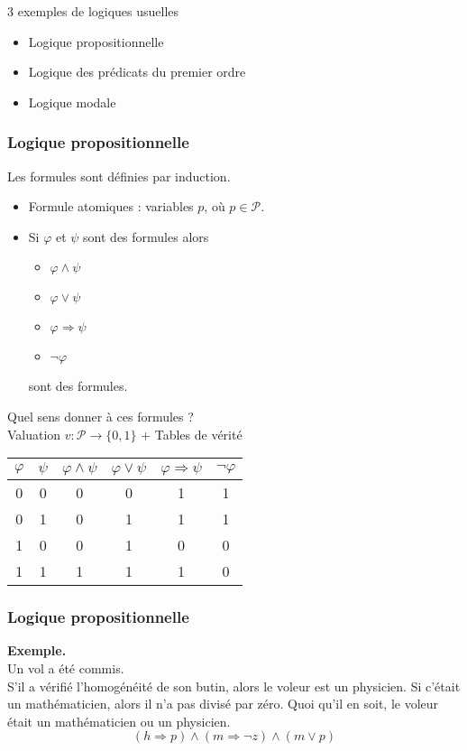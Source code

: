 \documentclass{beamer}
\newcommand{\itemz}{\item[$\triangleright$]}
\begin{document}
\begin{frame}
3 exemples de logiques usuelles
\begin{itemize}
\itemz Logique propositionnelle
\itemz Logique des prédicats du premier ordre
\itemz Logique modale
\end{itemize}
\end{frame}

\begin{frame}
\frametitle{Logique propositionnelle}
Les formules sont définies par induction.
\pause
\begin{itemize}
\itemz Formule atomiques : variables $p$, où $p \in \mathcal{P}$.
\pause
\itemz Si $\varphi$ et $\psi$ sont des formules alors
\pause
\begin{itemize}
\itemz $\varphi \wedge \psi$
\pause
\itemz $\varphi \vee \psi$
\pause
\itemz $\varphi \Rightarrow \psi$
\pause
\itemz $\neg \varphi$
\end{itemize}
sont des formules.
\end{itemize}
\pause
Quel sens donner à ces formules ? \\
Valuation $v : \mathcal{P} \to \{0,1\}$ + Tables de vérité
\pause
\begin{center}
\begin{tabular}{|c|c|c|c|c|c|}
  \hline
  $\varphi$ & $\psi$ & $\varphi \wedge \psi$ & $\varphi \vee \psi$ & $\varphi \Rightarrow \psi$ & $\neg \varphi$ \\
  \hline
  0 & 0 & 0 & 0 & 1 & 1 \\ 
  0 & 1 & 0 & 1 & 1 & 1 \\
  1 & 0 & 0 & 1 & 0 & 0 \\
  1 & 1 & 1 & 1 & 1 & 0 \\
  \hline
\end{tabular}
\end{center}
\end{frame}

\begin{frame}
\frametitle{Logique propositionnelle}
\textbf{Exemple.}\\
Un vol a été commis.\\
S'il a vérifié l'homogénéité de son butin, alors le voleur est un physicien. Si c'était un mathématicien, alors il n'a pas divisé par zéro. Quoi qu'il en soit, le voleur était un mathématicien ou un physicien.
\[ (h \Rightarrow p) \wedge (m \Rightarrow \neg z) \wedge (m \vee p) \]
\end{frame}
\end{document}
